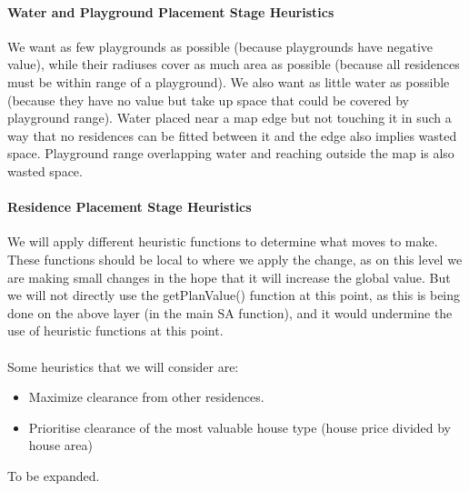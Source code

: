 \documentclass{article}
\begin{document}
\paragraph{Water and Playground Placement Stage Heuristics} 

We want as few playgrounds as possible (because playgrounds have negative value), while their radiuses cover as much area as possible (because all residences must be within range of a playground). We also want as little water as possible (because they have no value but take up space that could be covered by playground range). Water placed near a map edge but not touching it in such a way that no residences can be fitted between it and the edge also implies wasted space. Playground range overlapping water and reaching outside the map is also wasted space. 

\paragraph{Residence Placement Stage Heuristics}

We will apply different heuristic functions to determine what moves to make. These functions should be local to where we apply the change, as on this level we are making small changes in the hope that it will increase the global value. But we will not directly use the getPlanValue() function at this point, as this is being done on the above layer (in the main SA function), and it would undermine the use of heuristic functions at this point.
\\
\\
Some heuristics that we will consider are:
\begin{itemize}
 \item Maximize clearance from other residences. 
 \item Prioritise clearance of the most valuable house type (house price divided by house area)
\end{itemize}

To be expanded. 

\end{document}
